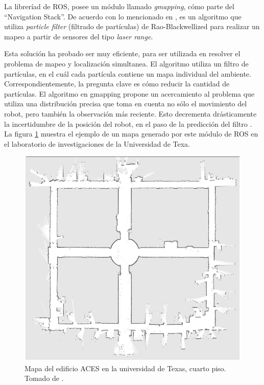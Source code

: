 La libreríad de ROS, posee un módulo llamado \textit{gmapping}, cómo parte del ``Navigation Stack''. De acuerdo con lo mencionado en \cite{Abbeel2006}, es un algoritmo que utiliza \textit{particle filter} (filtrado de partículas) de Rao-Blackwellized para realizar un mapeo a partir de sensores del tipo \textit{laser range}.

Esta solución ha probado ser muy eficiente, para ser utilizada en resolver el problema de mapeo y localización simultanea. El algoritmo utiliza un filtro de partículas, en el cuál cada partícula contiene un mapa individual del ambiente. Correspondientemente, la pregunta clave es cómo reducir la cantidad de partículas. El algoritmo en gmapping propone un acercamiento al problema que utiliza una distribución precisa que toma en cuenta no sólo el movimiento del robot, pero también la observación más reciente. Esto decrementa drásticamente la incertidumbre de la posición del robot, en el paso de la predicción del filtro \cite{Grisetti2007}. La figura \ref{F:mapa} muestra el ejemplo de un mapa generado por este módulo de ROS en el laboratorio de investigaciones de la Universidad de Texa.

\begin{figure}[H]
\centering
\includegraphics[scale=0.3]{imagenes/intel3d.jpg}
\caption{Mapa del edificio ACES en la universidad de Texas, cuarto piso. Tomado de \cite{Grisetti2007}.}
\label{F:mapa}
\end{figure}


